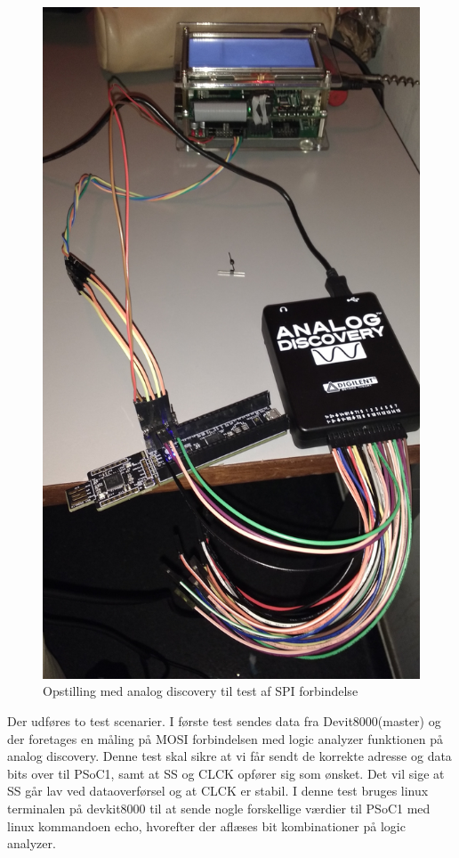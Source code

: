\begin{figure}[H]
\includegraphics{Screenshots/Test_analog}
\caption{Opstilling med analog discovery til test af SPI forbindelse} 
\end{figure}

Der udføres to test scenarier. I første test sendes data fra Devit8000(master) og der foretages en måling på MOSI forbindelsen med logic analyzer
funktionen på analog discovery. Denne test skal sikre at vi får sendt de korrekte adresse og data bits over til PSoC1, samt at SS og CLCK opfører sig 
som ønsket. Det vil sige at SS går lav ved dataoverførsel og at CLCK er stabil. I denne test bruges linux terminalen på devkit8000 til at sende nogle forskellige
værdier til PSoC1 med linux kommandoen echo, hvorefter der aflæses bit kombinationer på logic analyzer.

